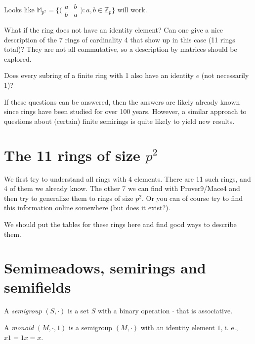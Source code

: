 \documentclass{amsart}
\begin{document}
Looks like $\mathbb M_{p^2}=\big\{\big(\begin{smallmatrix} a&b\\b&a\end{smallmatrix}\big) : a,b\in\mathbb Z_p\big\}$ will work.


What if the ring does not have an identity element? Can one give a nice description of the 7 rings of cardinality 4 that show up in this case (11 rings total)? They are not all commutative, so a description by matrices should be explored.

Does every subring of a finite ring with 1 also have an identity $e$ (not necessarily 1)?

If these questions can be answered, then the answers are likely already known since rings have been studied for over 100 years. However, a similar approach to questions about (certain) finite semirings is quite likely to yield new results.

\section{The 11 rings of size $p^2$ }

We first try to understand all rings with 4 elements. There are 11 such rings, and 4 of them we already know. The other 7 we can find with Prover9/Mace4 and then try to generalize them to rings of size $p^2$. Or you can of course try to find this information online somewhere (but does it exist?).

We should put the tables for these rings here and find good ways to describe them.





\section{Semimeadows, semirings and semifields}

A \textit{semigroup} $(S,\cdot)$ is a set $S$ with a binary operation $\cdot$ that is associative.

A \textit{monoid} $(M,\cdot, 1)$ is a semigroup $(M,\cdot)$ with an identity element $1$, i. e., $x1=1x=x$.
\end{document}
